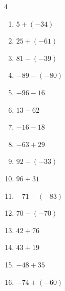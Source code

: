 \begin{multicols}{4}
\begin{enumerate}
        \phantom{$=116$}

  \item $5+(-34)$

        \phantom{$=-29$}

  \item $25+(-61)$

        \phantom{$=-36$}

  \item $81-(-39)$

        \phantom{$=120$}

  \item $-89-(-80)$

        \phantom{$=-9$}

  \item $-96-16$

        \phantom{$=-112$}

  \item $13-62$

        \phantom{$=-49$}

  \item $-16-18$

        \phantom{$=-34$}

  \item $-63+29$

        \phantom{$=-34$}

  \item $92-(-33)$

        \phantom{$=125$}

  \item $96+31$

        \phantom{$=127$}

  \item $-71-(-83)$

        \phantom{$=12$}

  \item $70-(-70)$

        \phantom{$=140$}

  \item $42+76$

        \phantom{$=118$}

  \item $43+19$

        \phantom{$=62$}

\columnbreak %

  \item $-48+35$

        \phantom{$=-13$}

  \item $-74+(-60)$


\end{enumerate}
\end{multicols}
